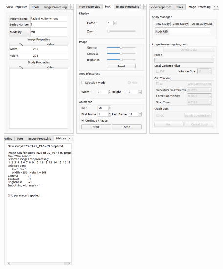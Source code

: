 {\begin {center}
        \centering
        \includegraphics[height=7cm]{media/existing_app/tabs/view_properties.png}
        \includegraphics[height=7cm]{media/existing_app/tabs/tools.png}
        \includegraphics[height=7cm]{media/existing_app/tabs/image_processing_inactive.png}
        \includegraphics[height=7cm]{media/existing_app/tabs/history.png}
        \captionsetup{justification=centering}
\end {center}

}
